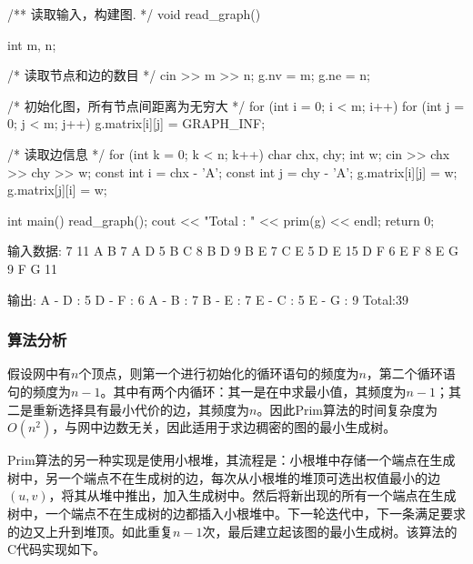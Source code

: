 \begin{Codex}[label=am_graph_prim1.cpp]
    /** 读取输入，构建图. */
    void read_graph() {
        int m, n;

        /* 读取节点和边的数目 */
        cin >> m >> n;
        g.nv = m;
        g.ne = n;

        /* 初始化图，所有节点间距离为无穷大 */
        for (int i = 0; i < m; i++) {
            for (int j = 0; j < m; j++) {
                g.matrix[i][j] = GRAPH_INF;
            }
        }

        /* 读取边信息 */
        for (int k = 0; k < n; k++) {
            char chx, chy;
            int w;
            cin >> chx >> chy >> w;
            const int i = chx - 'A';
            const int j = chy - 'A';
            g.matrix[i][j] = w;
            g.matrix[j][i] = w;
        }
    }
    int main() {
        read_graph();
        cout << "Total : " << prim(g) << endl;
        return 0;
    }

    输入数据:
        7 11
        A B 7
        A D 5
        B C 8
        B D 9
        B E 7
        C E 5
        D E 15
        D F 6
        E F 8
        E G 9
        F G 11

    输出:
        A - D : 5
        D - F : 6
        A - B : 7
        B - E : 7
        E - C : 5
        E - G : 9
        Total:39
\end{Codex}


\subsubsection{算法分析}
假设网中有$n$个顶点，则第一个进行初始化的循环语句的频度为$n$，第二个循环语句的频度为$n-1$。其中有两个内循环：其一是在中求最小值，其频度为$n-1$；其二是重新选择具有最小代价的边，其频度为$n$。因此Prim算法的时间复杂度为$O(n^2)$，与网中边数无关，因此适用于求边稠密的图的最小生成树。

Prim算法的另一种实现是使用小根堆，其流程是：小根堆中存储一个端点在生成树中，另一个端点不在生成树的边，每次从小根堆的堆顶可选出权值最小的边$(u, v)$，将其从堆中推出，加入生成树中。然后将新出现的所有一个端点在生成树中，一个端点不在生成树的边都插入小根堆中。下一轮迭代中，下一条满足要求的边又上升到堆顶。如此重复$n-1$次，最后建立起该图的最小生成树。该算法的C代码实现如下。





